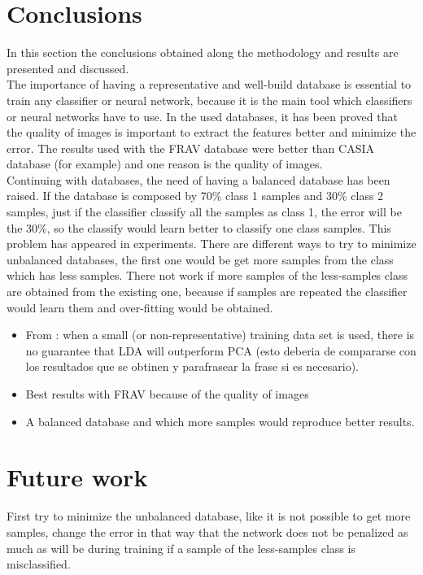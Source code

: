 \clearpage
\section{Conclusions}
In this section the conclusions obtained along the methodology and results are presented and discussed.\\

The importance of having a representative and well-build database is essential to train any classifier or neural network, because it is the main tool which classifiers or neural networks have to use. In the used databases, it has been proved that the quality of images is important to extract the features better and minimize the error. The results used with the FRAV database were better than CASIA database (for example) and one reason is the quality of images.\\

Continuing with databases, the need of having a balanced database has been raised. If the database is composed by 70\% class 1 samples and 30\% class 2 samples, just if the classifier classify all the samples as class 1, the error will be the 30\%, so the classify would learn better to classify one class samples. This problem has appeared in experiments. There are different ways to try to minimize unbalanced databases, the first one would be get more samples from the class which has less samples. There not work if more samples of the less-samples class are obtained from the existing one, because if samples are repeated the classifier would learn them and over-fitting would be obtained.\\

\begin{itemize}
\item From \cite{PCAvsLDA}: when a small (or non-representative) training data set is used, there is no guarantee that LDA will outperform PCA (esto deberia de compararse con los resultados que se obtinen y parafrasear la frase si es necesario).
\item Best results with FRAV because of the quality of images
\item A balanced database and which more samples would reproduce better results.
\end{itemize}

\section{Future work}
First try to minimize the unbalanced database, like it is not possible to get more samples, change the error in that way that the network does not be penalized as much as will be during training if a sample of the less-samples class  is misclassified.\\
